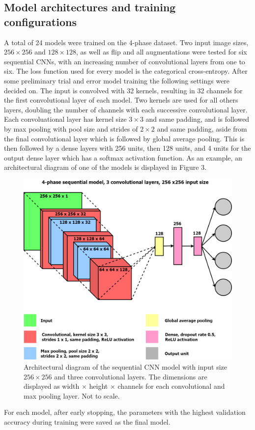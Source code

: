 \documentclass[12pt]{article}
\begin{document}
\subsection{Model architectures and training configurations}
A total of 24 models were trained on the 4-phase dataset. Two input image sizes, $256 \times 256$ and $128 \times 128$, as well as flip and all augmentations were tested for six sequential CNNs, with an increasing number of convolutional layers from one to six.  The loss function used for every model is the categorical cross-entropy. After some preliminary trial and error model training the following settings were decided on. The input is convolved with 32 kernels, resulting in 32 channels for the first convolutional layer of each model. Two kernels are used for all others layers, doubling the number of channels with each successive convolutional layer. Each convoluational layer has kernel size $3 \times 3$ and same padding, and is followed by max pooling with pool size and strides of $2 \times 2$ and same padding, aside from the final convolutional layer which is followed by global average pooling. This is then followed by a dense layers with 256 units, then 128 units, and 4 units for the output dense layer which has a softmax activation function. As an example, an architectural diagram of one of the models is displayed in Figure 3.
\begin{figure}[h]
\centering
\includegraphics[width=5.5812in]{images/v3_conv_3_diagram.png}
\caption{Architectural diagram of the sequential CNN model with input size $256 \times 256$ and three convolutional layers. The dimensions are displayed as width $\times$ height $\times$ channels for each convolutional and max pooling layer. Not to scale.}
\end{figure}
For each model, after early stopping, the parameters with the highest validation accuracy during training were saved as the final model.
\end{document}
